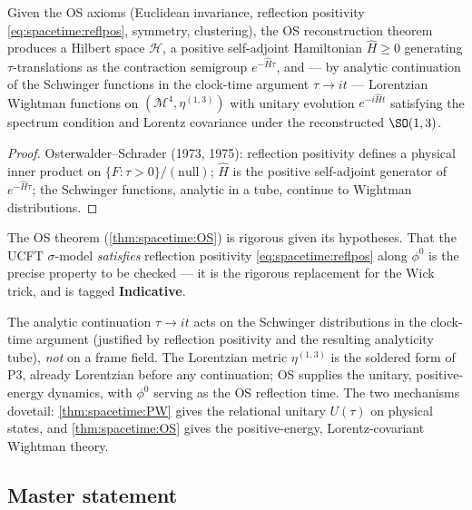 \begin{theorem}
\label{thm:spacetime:OS}
Given the OS axioms (Euclidean invariance, reflection positivity
\eqref{eq:spacetime:reflpos}, symmetry, clustering), the OS reconstruction theorem
produces a Hilbert space $\mathcal H$, a positive self-adjoint Hamiltonian
$\widehat H\ge0$ generating $\tau$-translations as the contraction semigroup
$e^{-\widehat H\tau}$, and --- by analytic continuation of the Schwinger functions in
the clock-time argument $\tau\to it$ --- Lorentzian Wightman functions on
$(\mathcal M^4,\eta^{(1,3)})$ with unitary evolution $e^{-i\widehat H t}$ satisfying the
spectrum condition and Lorentz covariance under the reconstructed $\SO(1,3)$.
\end{theorem}
\begin{proof}
Osterwalder--Schrader (1973, 1975): reflection positivity defines a physical inner
product on $\{F:\tau>0\}/(\text{null})$; $\widehat H$ is the positive self-adjoint
generator of $e^{-\widehat H\tau}$; the Schwinger functions, analytic in a tube,
continue to Wightman distributions.
\end{proof}

\begin{indicative}
\label{ind:spacetime:reflpos}
The OS theorem (\autoref{thm:spacetime:OS}) is rigorous given its hypotheses. That the
UCFT $\sigma$-model \emph{satisfies} reflection positivity \eqref{eq:spacetime:reflpos}
along $\phi^0$ is the precise property to be checked --- it is the rigorous
replacement for the Wick trick, and is tagged \textbf{Indicative}.
\end{indicative}

The analytic continuation $\tau\to it$ acts on the Schwinger distributions in the
clock-time argument (justified by reflection positivity and the resulting analyticity
tube), \emph{not} on a frame field. The Lorentzian metric $\eta^{(1,3)}$ is the
soldered form of P3, already Lorentzian before any continuation; OS supplies the
unitary, positive-energy dynamics, with $\phi^0$ serving as the OS reflection time. The
two mechanisms dovetail: \autoref{thm:spacetime:PW} gives the relational unitary
$U(\tau)$ on physical states, and \autoref{thm:spacetime:OS} gives the positive-energy,
Lorentz-covariant Wightman theory.

\subsection{Master statement}
\label{sec:spacetime:master}

